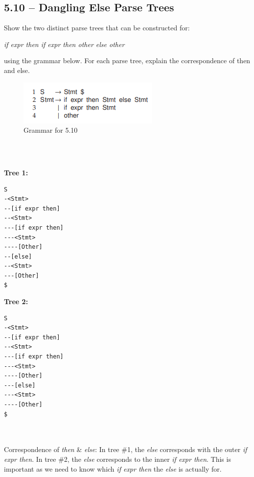\documentclass[letterpaper, 10pt]{article}
\begin{document}
\subsection{5.10 -- Dangling Else Parse Trees}
Show the two distinct parse trees that can be constructed for: \\
\vspace{-.5cm}
\begin{center}
    \textit{if expr then if expr then other else other} \\
\end{center}
using the grammar below. For each parse tree, explain the correspondence of then and else.
\begin{figure} [h]
    \centering
    \includegraphics[width=0.6\linewidth]{5-10_Grammar.png}
    \caption{Grammar for 5.10}
    \label{fig:enter-label}
\end{figure} \\
\vspace{.3cm} \\
\begin{minipage}{0.48\textwidth} %
\textbf{Tree 1: }
\begin{verbatim}
S
-<Stmt>
--[if expr then]
--<Stmt>
---[if expr then]
---<Stmt>
----[Other]
--[else]
--<Stmt>
---[Other]
$
\end{verbatim}
\end{minipage}%
\hfill 
\begin{minipage}{0.5\textwidth}
\textbf{Tree 2: }
\begin{verbatim}
S
-<Stmt>
--[if expr then]
--<Stmt>
---[if expr then]
---<Stmt>
----[Other]
---[else]
---<Stmt>
----[Other]
$
\end{verbatim}
\end{minipage} \\
\vspace{.5cm} \\
Correspondence of \textit{then} \& \textit{else}: In tree \#1, the \textit{else} corresponds with the outer \textit{if expr then}. In tree \#2, the \textit{else} corresponds to the inner \textit{if expr then}. This is important as we need to know which \textit{if expr then} the \textit{else} is actually for.
\newpage
\end{document}
